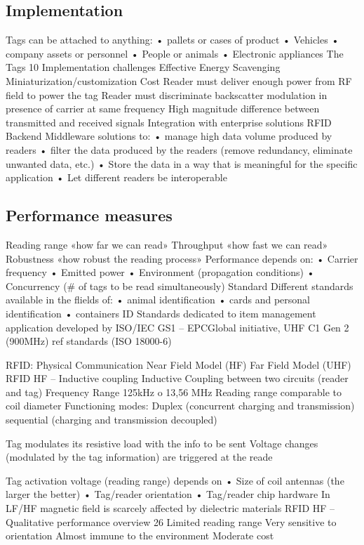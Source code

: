 \subsection{Implementation}
Tags can be attached to
anything:
• pallets or cases of product
• Vehicles
• company assets or personnel
• People or animals
• Electronic appliances
The Tags
10
Implementation challenges
Effective Energy Scavenging
Miniaturization/customization
Cost
Reader must deliver enough power from RF field to power the tag
Reader must discriminate backscatter modulation in presence of carrier at
same frequency
High magnitude difference between transmitted and received signals
Integration with enterprise solutions
RFID Backend Middleware solutions to:
• manage high data volume produced by readers
• filter the data produced by the readers (remove redundancy, eliminate
unwanted data, etc.)
• Store the data in a way that is meaningful for the specific application
• Let different readers be interoperable

\subsection{Performance measures}
Reading range
«how far we can read»
Throughput
«how fast we can read»
Robustness
«how robust the reading process»
Performance depends on:
• Carrier frequency
• Emitted power
• Environment (propagation conditions)
• Concurrency (# of tags to be read simultaneously)
Standard Different standards available in the flields of:
• animal identification
• cards and personal identification
• containers ID
Standards dedicated to item management application developed by
ISO/IEC
GS1 – EPCGlobal initiative, UHF C1 Gen 2 (900MHz) ref standards (ISO
18000-6)


RFID: Physical Communication  Near Field Model (HF) Far Field Model (UHF)
RFID HF – Inductive coupling
Inductive Coupling between two circuits (reader and tag)
Frequency Range 125kHz o 13,56 MHz
Reading range comparable to coil diameter
Functioning modes:
Duplex (concurrent charging and transmission)
sequential (charging and transmission decoupled)

Tag modulates its resistive load with the info to be sent
Voltage changes (modulated by the tag information) are triggered at the
reade

Tag activation voltage (reading range) depends on
• Size of coil antennas (the larger the better)
• Tag/reader orientation
• Tag/reader chip hardware
In LF/HF magnetic field is scarcely affected by dielectric materials
RFID HF – Qualitative performance overview
26
Limited reading range
Very sensitive to orientation
Almost immune to the environment
Moderate cost

